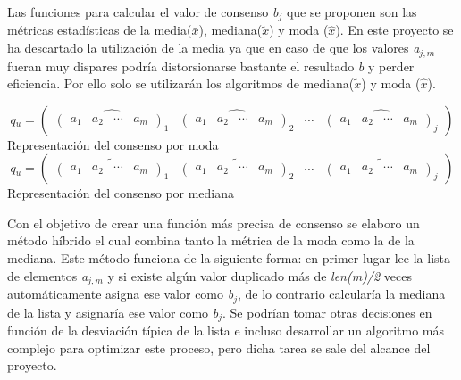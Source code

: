 Las funciones para calcular el valor de consenso \textit{b$_{j}$} que se proponen son las métricas estadísticas de la media(\(\bar{x}\)), mediana(\(\tilde{x}\)) y moda (\(\hat{x}\)). En este proyecto se ha descartado la utilización de la media ya que en caso de que los valores \textit{a$_{j, m}$} fueran muy dispares podría distorsionarse bastante el resultado \textit{b} y perder eficiencia. Por ello solo se utilizarán los algoritmos de mediana(\(\tilde{x}\)) y moda (\(\hat{x}\)).
\begin{center}
    \[  \textit{q$_{u}$} = 
        \begin{pmatrix}
            \widehat{ \begin{pmatrix} a_{1}  &  a_{2}  &  \cdots   & a_{m} \end{pmatrix}_{1}} & 
            \widehat{ \begin{pmatrix} a_{1}  &  a_{2}  &  \cdots   & a_{m} \end{pmatrix}_{2}}& 
            \cdots & 
            \widehat{ \begin{pmatrix} a_{1}  &  a_{2}  &  \cdots   & a_{m} \end{pmatrix}_{j}}
        \end{pmatrix}
    \]
    Representación del consenso por moda
    \\
    \[  \textit{q$_{u}$} = 
        \begin{pmatrix}
            \widetilde{ \begin{pmatrix} a_{1}  &  a_{2}  &  \cdots   & a_{m} \end{pmatrix}_{1}} & 
            \widetilde{ \begin{pmatrix} a_{1}  &  a_{2}  &  \cdots   & a_{m} \end{pmatrix}_{2}}& 
            \cdots & 
            \widetilde{ \begin{pmatrix} a_{1}  &  a_{2}  &  \cdots   & a_{m} \end{pmatrix}_{j}}
        \end{pmatrix}
    \]
    Representación del consenso por mediana
\end{center}    
Con el objetivo de crear una función más precisa de consenso se elaboro un método híbrido el cual combina tanto la métrica de la moda como la de la mediana. Este método funciona de la siguiente forma: en primer lugar lee la lista de elementos \textit{a$_{j, m}$} y si existe algún valor duplicado más de \textit{len(m)/2} veces automáticamente asigna ese valor como \textit{b$_{j}$}, de lo contrario calcularía la mediana de la lista y asignaría ese valor como \textit{b$_{j}$}. Se podrían tomar otras decisiones en función de la desviación típica de la lista e incluso desarrollar un algoritmo más complejo para optimizar este proceso, pero dicha tarea se sale del alcance del proyecto.

